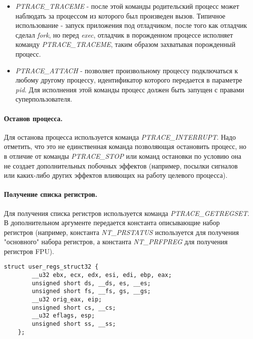 \begin{itemize}

    \item \textit{PTRACE\_TRACEME} - после этой команды родительский процесс может наблюдать за процессом из которого был произведен вызов. Типичное использование - запуск приложения под отладчиком, после того как отладчик сделал \textit{fork}, но перед \textit{exec}, отладчик в порожденном процессе исполняет команду \textit{PTRACE\_TRACEME}, таким образом захватывая порожденный процесс.

    \item \textit{PTRACE\_ATTACH} - позволяет произвольному процессу подключаться к любому другому процессу, идентификатор которого передается в параметре \textit{pid}. Для исполнения этой команды процесс должен быть запущен с правами суперпользователя.

\end{itemize}

\paragraph{Останов процесса.}

Для останова процесса используется команда \textit{PTRACE\_INTERRUPT}. Надо отметить, что это не единственная команда позволяющая остановить процесс, но в отличие от команды \textit{PTRACE\_STOP} или команд остановки по условию она не создает дополнительных побочных эффектов (например, посылки сигналов или каких-либо других эффектов влияющих на работу целевого процесса).

\paragraph{Получение списка регистров.}

Для получения списка регистров используется команда \textit{PTRACE\_GETREGSET}. В дополнительном аргументе передается константа описывающие набор регистров (например, константа \textit{NT\_PRSTATUS} используется для получения "основного" набора регистров, а константа \textit{NT\_PRFPREG} для получения регистров FPU).

\begin{lstlisting}[caption=Основной набор регистров, label=code:general]
    struct user_regs_struct32 {
        __u32 ebx, ecx, edx, esi, edi, ebp, eax;
        unsigned short ds, __ds, es, __es;
        unsigned short fs, __fs, gs, __gs;
        __u32 orig_eax, eip;
        unsigned short cs, __cs;
        __u32 eflags, esp;
        unsigned short ss, __ss;
    };
\end{lstlisting}


